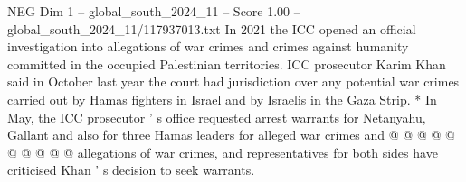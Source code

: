 \begin{textsample}{NEG Dim 1 – global\_south\_2024\_11 – Score 1.00 – global\_south\_2024\_11/117937013.txt}
In 2021 the ICC opened an official investigation into allegations of war crimes and crimes against humanity committed in the occupied Palestinian territories.
ICC prosecutor Karim Khan said in October last year the court had jurisdiction over any potential war crimes carried out by Hamas fighters in Israel and by Israelis in the Gaza Strip. * In May, the ICC prosecutor ' s office requested arrest warrants for Netanyahu, Gallant and also for three Hamas leaders for alleged war crimes and @ @ @ @ @ @ @ @ @ @ allegations of war crimes, and representatives for both sides have criticised Khan ' s decision to seek warrants.

\end{textsample}
